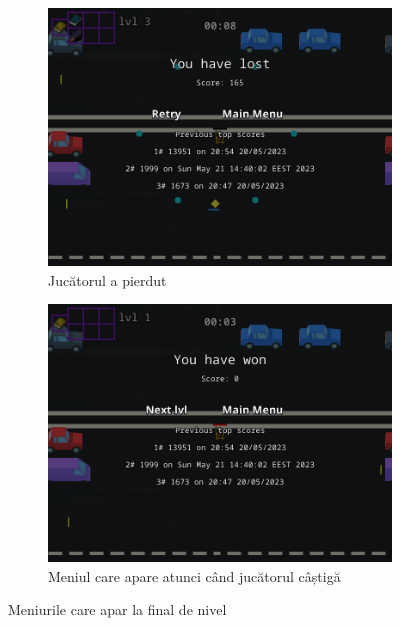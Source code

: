 \documentclass{article}
\begin{document}
    \begin{figure}[H]
        \centering
        \begin{subfigure}{0.45\textwidth}
            \includegraphics[width=\textwidth]{game-over-lost-menu}
            \centering
            \caption{Jucătorul a pierdut}
        \end{subfigure}
        \hfill
        \begin{subfigure}{0.45\textwidth}
            \includegraphics[width=\textwidth]{game-over-won-menu}
            \centering
            \caption{Meniul care apare atunci când jucătorul câștigă}
        \end{subfigure}
        \caption{Meniurile care apar la final de nivel}
    \end{figure}
\end{document}
